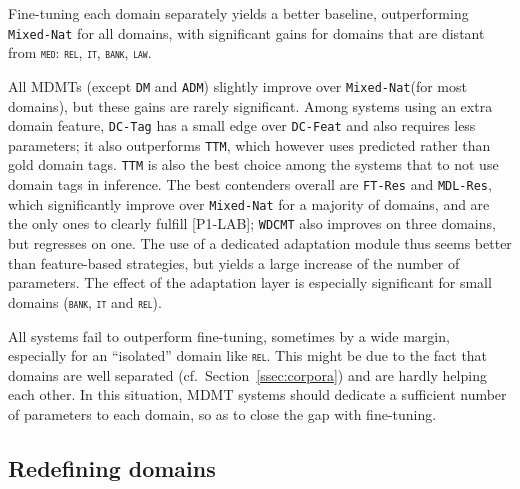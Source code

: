 \documentclass[11pt,a4paper]{article}
\newcommand{\fyDone}[1]{\done[FY]\Todo[FY:]{\textcolor{orange}{#1}}}
\newcommand{\revision}[1]{#1}
\newcommand{\domain}[1]{\texttt{\textsc{#1}}}
\newcommand{\system}[1]{\texttt{{#1}}}
\begin{document}
Fine-tuning each domain separately yields a better baseline, outperforming \system{Mixed-Nat} for all domains, with significant gains for domains that are distant from \domain{med}: \domain{rel}, \domain{it}, \domain{bank}, \domain{law}.
\fyDone{Add 2 averages ?}\fyDone{Significance testing wrt Mix Generic, Full Fine-tuned, for each domain}

All MDMTs (except \system{DM} and \system{ADM}) slightly improve over \system{Mixed-Nat}(for most domains), but these gains are rarely significant. \revision{Among systems using an extra domain feature, \system{DC-Tag} has a small edge over \system{DC-Feat} and also requires less parameters; it also outperforms \system{TTM}, which however uses predicted rather than gold domain tags. \system{TTM} is also the best choice among the systems that to not use domain tags in inference.} \revision{The best contenders overall are  \system{FT-Res} and \system{MDL-Res}, which significantly improve over \system{Mixed-Nat} for a majority of domains, and are the only ones to clearly fulfill [P1-LAB];} \system{WDCMT} also improves on three domains, but regresses on one. The use of a dedicated adaptation module thus seems better than feature-based strategies, \revision{but yields a large increase of the number of parameters.} The effect of the adaptation layer is especially significant for small domains (\domain{bank}, \domain{it} and \domain{rel}).


All systems fail to outperform fine-tuning, sometimes by a wide margin, especially for an ``isolated'' domain like \domain{rel}. This might be due to the fact that domains are well separated (cf.\ Section~\ref{ssec:corpora}) and are hardly helping each other. In this situation, MDMT systems should dedicate a sufficient number of parameters to each domain, so as to close the gap with fine-tuning.
\fyDone{More comments when we have all the results}\fyDone{Importance of sharing and unsharing}

\subsection{Redefining domains \label{ssec:redomains}}
\end{document}
